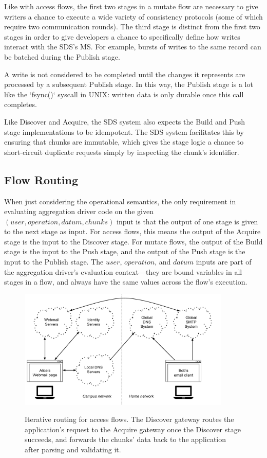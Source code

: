 Like with access flows, the first two stages in a mutate flow are necessary to give writers a
chance to execute a wide variety of consistency protocols (some of which require
two communication rounds).  The third stage is distinct from the first two stages
in order to give developers a chance to specifically define how writes
interact with the SDS's MS.  For example, bursts of writes to the same record
can be batched during the Publish stage.

A write is not considered to be completed until the changes it represents are
processed by a subsequent Publish stage.  In this way, the Publish stage is a lot
like the `fsync()` syscall in UNIX:  written data is only durable once this call
completes.

Like Discover and Acquire, the SDS system also expects the Build and Push stage
implementations to be idempotent.  The SDS system facilitates this by ensuring
that chunks are immutable, which gives the stage logic a chance to short-circuit
duplicate requests simply by inspecting the chunk's identifier.

\subsection{Flow Routing}

When just considering the operational semantics, the only requirement in evaluating
aggregation driver code on the given $(user, operation, datum, chunks)$ input is
that the output of one stage is given to the next stage as input.  For access
flows, this means the output of the Acquire stage is the input to the Discover
stage.  For mutate flows, the output of the Build stage is the input to the Push
stage, and the output of the Push stage is the input to the Publish stage.  The
$user$, $operation$, and $datum$ inputs are part of the aggregation driver's
evaluation context---they are bound variables in all stages in a flow, and
always have the same values across the flow's execution.

\begin{figure}[h]
   \caption{Iterative routing for access flows.  The Discover gateway routes the
   application's request to the Acquire gateway once the Discover stage
   succeeds, and forwards the chunks' data back to the application after parsing
   and validating it.}
   \centering
   \includegraphics[width=0.9\textwidth,page=9]{figures/dissertation-figures}
   \label{fig:chap2-access-flow-protocol}
\end{figure}

